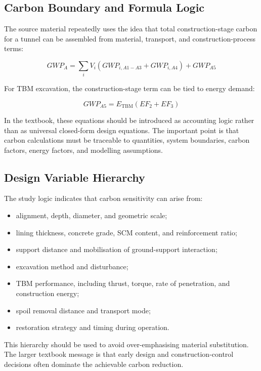 \documentclass[11pt]{article}
\begin{document}
\subsection*{Carbon Boundary and Formula Logic}

The source material repeatedly uses the idea that total construction-stage carbon for a
tunnel can be assembled from material, transport, and construction-process
terms:

\[
GWP_A = \sum_i V_i \left(GWP_{i,A1-A3} + GWP_{i,A4}\right) + GWP_{A5}
\]

For TBM excavation, the construction-stage term can be tied to energy demand:

\[
GWP_{A5} = E_{\mathrm{TBM}} \left(EF_2 + EF_3\right)
\]

In the textbook, these equations should be introduced as accounting logic
rather than as universal closed-form design equations. The important point is
that carbon calculations must be traceable to quantities, system boundaries,
carbon factors, energy factors, and modelling assumptions.

\subsection*{Design Variable Hierarchy}

The study logic indicates that carbon sensitivity can arise from:

\begin{itemize}
  \item alignment, depth, diameter, and geometric scale;
  \item lining thickness, concrete grade, SCM content, and reinforcement ratio;
  \item support distance and mobilisation of ground-support interaction;
  \item excavation method and disturbance;
  \item TBM performance, including thrust, torque, rate of penetration, and
  construction energy;
  \item spoil removal distance and transport mode;
  \item restoration strategy and timing during operation.
\end{itemize}

This hierarchy should be used to avoid over-emphasising material substitution.
The larger textbook message is that early design and construction-control
decisions often dominate the achievable carbon reduction.
\end{document}
